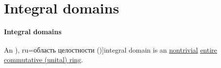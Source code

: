 \section{Integral domains}\label{sec:integral_domains}

\paragraph{Integral domains}

\begin{definition}\label{def:integral_domain}
  An \term[bg=област на цялостност (\cite[393]{Обрешков1962ВисшаАлгебра}), ru=область целостности (\cite[def. 3.5.1]{Винберг2014КурсАлгебры})]{integral domain} is an \hyperref[def:ring/trivial]{nontrivial} \hyperref[def:entire_semiring]{entire} \hyperref[def:ring/commutative]{commutative (unital) ring}.
\end{definition}

